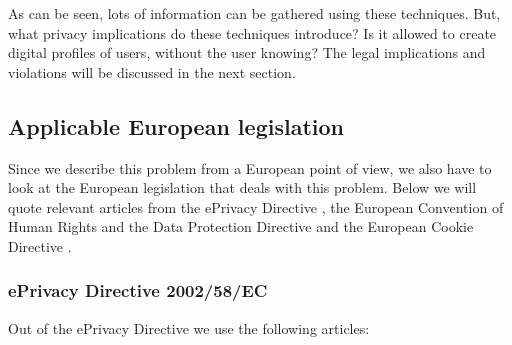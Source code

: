 \documentclass[11pt]{article}
\newcommand{\tocheck}[1]{{\bf !?: #1 :!?}}
\newcommand{\ePD}{ePrivacy Directive }
\newcommand{\DPD}{Data Protection Directive }
\begin{document}
As can be seen, lots of information can be gathered using these techniques. But, what privacy implications do these techniques introduce? Is it allowed to create digital profiles of users, without the user knowing? The legal implications and violations will be discussed in the next section.


\subsection{Applicable European legislation}
Since we describe this problem from a European point of view, we also have to look at the European legislation that deals with this problem. Below we will quote relevant articles from the \ePD, the European Convention of Human Rights and the \DPD and the European Cookie Directive \cite{cookielaw}.


\subsubsection{\ePD 2002/58/EC}

Out of the \ePD we use the following articles:
\end{document}
